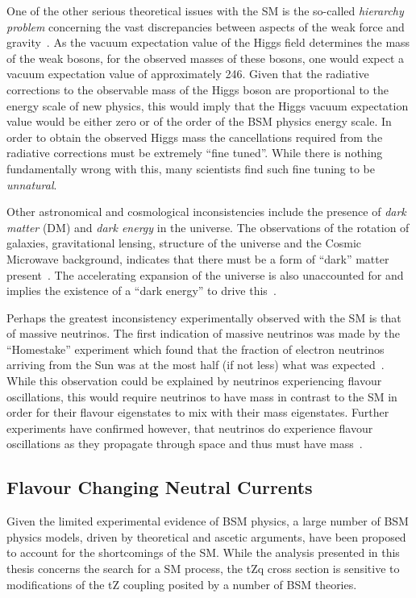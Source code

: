 One of the other serious theoretical issues with the SM is the so-called \emph{hierarchy problem} concerning the vast discrepancies between aspects of the weak force and gravity~\cite{Burdman:2007ck}.
As the vacuum expectation value of the Higgs field determines the mass of the weak bosons, for the observed masses of these bosons, one would expect a vacuum expectation value of approximately 246\GeV.
Given that the radiative corrections to the observable mass of the Higgs boson are proportional to the energy scale of new physics, this would imply that the Higgs vacuum expectation value would be either zero or of the order of the BSM physics energy scale.
In order to obtain the observed Higgs mass the cancellations required from the radiative corrections must be extremely ``fine tuned''.
While there is nothing fundamentally wrong with this, many scientists find such fine tuning to be \emph{unnatural}.

Other astronomical and cosmological inconsistencies include the presence of \emph{dark matter} (DM) and \emph{dark energy} in the universe.
The observations of the rotation of galaxies, gravitational lensing, structure of the universe and the Cosmic Microwave background, indicates that there must be a form of ``dark'' matter present~\cite{Aghanim:2018eyx}.
The accelerating expansion of the universe is also unaccounted for and implies the existence of a ``dark energy'' to drive this~\cite{Peebles:2002gy,Aghanim:2018eyx}.

Perhaps the greatest inconsistency experimentally observed with the SM is that of massive neutrinos.
The first indication of massive neutrinos was made by the ``Homestake'' experiment which found that the fraction of electron neutrinos arriving from the Sun was at the most half (if not less) what was expected~\cite{PhysRevLett.20.1205}.
While this observation could be explained by neutrinos experiencing flavour oscillations, this would require neutrinos to have mass in contrast to the SM in order for their flavour eigenstates to mix with their mass eigenstates.
Further experiments have confirmed however, that neutrinos do experience flavour oscillations as they propagate through space and thus must have mass~\cite{Fukuda:1998mi,Ahmad:2001an,PhysRevD.88.032002}.

\subsection{Flavour Changing Neutral Currents}\label{sec:fcncs}
Given the limited experimental evidence of BSM physics, a large number of BSM physics models, driven by theoretical and ascetic arguments, have been proposed to account for the shortcomings of the SM.
While the analysis presented in this thesis concerns the search for a SM process, the tZq cross section is sensitive to modifications of the tZ coupling posited by a number of BSM theories.

